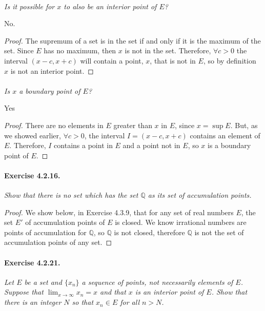 \documentclass[11pt]{article}
\begin{document}
\paragraph*{} \textit{Is it possible for $x$ to also be an interior point of $E$?} \newline

No. \begin{proof}
The supremum of a set is in the set if and only if it is the maximum of the set. Since $E$ has no maximum, then $x$ is not in the set. Therefore, $\forall c > 0$ the interval $(x - c, x + c)$ will contain a point, $x$, that is not in $E$, so by definition $x$ is not an interior point. 
\end{proof}

\paragraph*{} \textit{Is $x$ a boundary point of $E$?} \newline

Yes
\begin{proof} 
There are no elements in $E$ greater than $x$ in $E$, since $x = \sup E$. But, as we showed earlier, $\forall c > 0$, the interval $I = (x - c,  x + c)$ contains an element of $E$.  Therefore, $I$ contains a point in $E$ and a point not in $E$, so $x$ is a boundary point of $E$.
\end{proof}

\paragraph{Exercise 4.2.16.} \textit{Show that there is no set which has the set $\mathbb{Q}$ as its set of accumulation points.} 

\begin{proof}
We show below, in Exercise 4.3.9, that for any set of real numbers $E$, the set $E'$ of accumulation points of $E$ is closed. We know irrational numbers are points of accumulation for $\mathbb{Q}$, so $\mathbb{Q}$ is not closed, therefore $\mathbb{Q}$ is not the set of accumulation points of any set.
\end{proof}

\newpage
\paragraph{Exercise 4.2.21.} \textit{Let $E$ be a set and $\{x_n\}$ a sequence of points, not necessarily elements of $E$. Suppose that $\lim_{x\rightarrow\infty} x_n = x$ and that $x$ is an interior point of $E$. Show that there is an integer $N$ so that $x_n \in E$ for all $n > N$.} 
\end{document}
